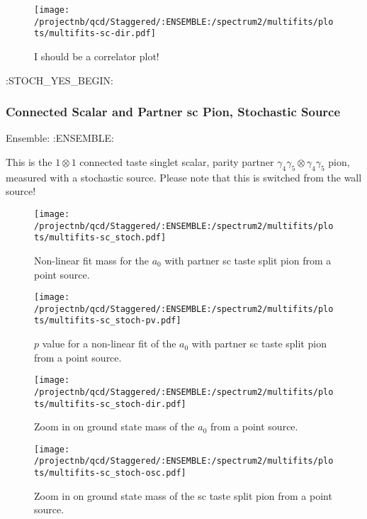 \begin{figure}[H]
\centering
\texttt{[image: /projectnb/qcd/Staggered/:ENSEMBLE:/spectrum2/multifits/plots/multifits-sc-dir.pdf]}
\caption{I should be a correlator plot!}
\end{figure}

\clearpage

:STOCH_YES_BEGIN:
\subsubsection{Connected Scalar and Partner sc Pion, Stochastic Source}

Ensemble: :ENSEMBLE:

This is the $1 \otimes 1$ connected taste singlet scalar, parity partner $\gamma_4 \gamma_5 \otimes \gamma_4 \gamma_5$ pion, measured with a stochastic source. Please note that this is switched from the wall source!

\begin{multicols}{2}
\begin{figure}[H]
\centering
\texttt{[image: /projectnb/qcd/Staggered/:ENSEMBLE:/spectrum2/multifits/plots/multifits-sc\_stoch.pdf]}
\caption{Non-linear fit mass for the $a_0$ with partner sc taste split pion from a point source.}
\end{figure}
\columnbreak
\begin{figure}[H]
\centering
\texttt{[image: /projectnb/qcd/Staggered/:ENSEMBLE:/spectrum2/multifits/plots/multifits-sc\_stoch-pv.pdf]}
\caption{$p$ value for a non-linear fit of the $a_0$ with partner sc taste split pion from a point source.}
\end{figure}
\end{multicols}

\begin{multicols}{2}
\begin{figure}[H]
\centering
\texttt{[image: /projectnb/qcd/Staggered/:ENSEMBLE:/spectrum2/multifits/plots/multifits-sc\_stoch-dir.pdf]}
\caption{Zoom in on ground state mass of the $a_0$ from a point source.}
\end{figure}
\columnbreak
\begin{figure}[H]
\centering
\texttt{[image: /projectnb/qcd/Staggered/:ENSEMBLE:/spectrum2/multifits/plots/multifits-sc\_stoch-osc.pdf]}
\caption{Zoom in on ground state mass of the sc taste split pion from a point source.}
\end{figure}
\end{multicols}

